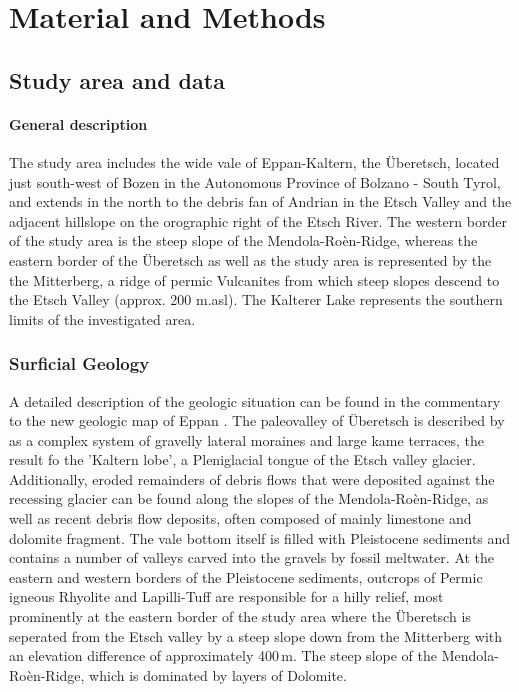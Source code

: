 \documentclass[preprint,12pt,authoryear]{elsarticle}
\begin{document}
\section{Material and Methods}
\subsection{Study area and data}
\paragraph{General description}
The study area includes the wide vale of Eppan-Kaltern, the {\"U}beretsch, located just south-west of Bozen in the Autonomous Province of Bolzano - South Tyrol, and extends in the north to the debris fan of Andrian in the Etsch Valley and the adjacent hillslope on the orographic right of the Etsch River. The western border of the study area is the steep slope of the Mendola-Ro\`en-Ridge, whereas the eastern border of the {\"U}beretsch as well as the study area is represented by the the Mitterberg, a ridge of permic Vulcanites from which steep slopes descend to the Etsch Valley (approx. 200 m.asl). The Kalterer Lake represents the southern limits of the investigated area.
\subsubsection{Surficial Geology}
A detailed  description of the geologic situation can be found in the commentary to the new geologic map of Eppan \citep{Avanzini2006}. 
The paleovalley of {\"U}beretsch is described by \cite{Scholz2005} as a complex system of gravelly lateral moraines and large kame terraces, the result fo the 'Kaltern lobe', a Pleniglacial tongue of the Etsch valley glacier. Additionally, eroded remainders of debris flows that were deposited against the recessing glacier can be found along the slopes of the Mendola-Ro\`en-Ridge, as well as recent debris flow deposits, often composed of mainly limestone and dolomite fragment. The vale bottom itself is filled with Pleistocene sediments and contains a  number of valleys carved into the gravels by fossil meltwater. At the eastern and western borders of the Pleistocene sediments, outcrops of Permic igneous Rhyolite and Lapilli-Tuff are responsible for a hilly relief, most prominently at the eastern border of the study area where the {\"U}beretsch is seperated from the Etsch valley by a steep slope down from the Mitterberg with an elevation difference of approximately 400\,m.   
 The steep slope of the Mendola-Ro\`en-Ridge, which is dominated by layers of Dolomite. 
 
\end{document}
